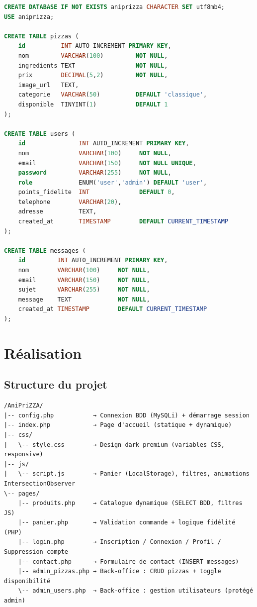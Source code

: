 \documentclass[a4paper,12pt]{article}
\begin{document}
\begin{lstlisting}[language=SQL, caption=Script de création de la base de données AniPriZZA]
CREATE DATABASE IF NOT EXISTS aniprizza CHARACTER SET utf8mb4;
USE aniprizza;

CREATE TABLE pizzas (
    id          INT AUTO_INCREMENT PRIMARY KEY,
    nom         VARCHAR(100)         NOT NULL,
    ingredients TEXT                 NOT NULL,
    prix        DECIMAL(5,2)         NOT NULL,
    image_url   TEXT,
    categorie   VARCHAR(50)          DEFAULT 'classique',
    disponible  TINYINT(1)           DEFAULT 1
);

CREATE TABLE users (
    id               INT AUTO_INCREMENT PRIMARY KEY,
    nom              VARCHAR(100)     NOT NULL,
    email            VARCHAR(150)     NOT NULL UNIQUE,
    password         VARCHAR(255)     NOT NULL,
    role             ENUM('user','admin') DEFAULT 'user',
    points_fidelite  INT              DEFAULT 0,
    telephone        VARCHAR(20),
    adresse          TEXT,
    created_at       TIMESTAMP        DEFAULT CURRENT_TIMESTAMP
);

CREATE TABLE messages (
    id         INT AUTO_INCREMENT PRIMARY KEY,
    nom        VARCHAR(100)     NOT NULL,
    email      VARCHAR(150)     NOT NULL,
    sujet      VARCHAR(255)     NOT NULL,
    message    TEXT             NOT NULL,
    created_at TIMESTAMP        DEFAULT CURRENT_TIMESTAMP
);

\end{lstlisting}

\section{Réalisation}

\subsection{Structure du projet}

\begin{verbatim}
/AniPriZZA/
|-- config.php           → Connexion BDD (MySQLi) + démarrage session
|-- index.php            → Page d'accueil (statique + dynamique)
|-- css/
|   \-- style.css        → Design dark premium (variables CSS, responsive)
|-- js/
|   \-- script.js        → Panier (LocalStorage), filtres, animations IntersectionObserver
\-- pages/
    |-- produits.php     → Catalogue dynamique (SELECT BDD, filtres JS)
    |-- panier.php       → Validation commande + logique fidélité (PHP)
    |-- login.php        → Inscription / Connexion / Profil / Suppression compte
    |-- contact.php      → Formulaire de contact (INSERT messages)
    |-- admin_pizzas.php → Back-office : CRUD pizzas + toggle disponibilité
    \-- admin_users.php  → Back-office : gestion utilisateurs (protégé admin)
\end{verbatim}
\end{document}
